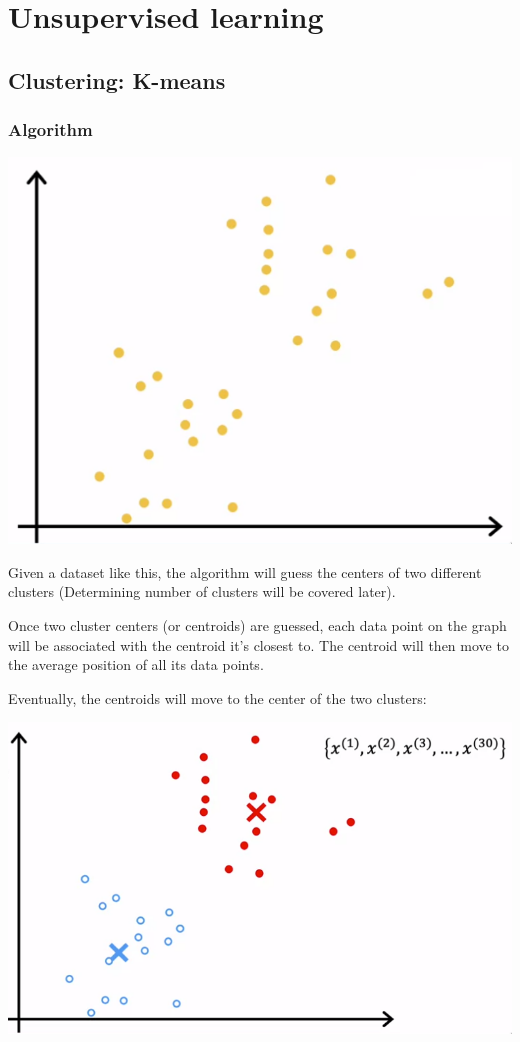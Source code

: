 \documentclass[12pt]{article}
\begin{document}
\section{Unsupervised learning}

\subsection{Clustering: K-means}

\subsubsection{Algorithm}

\includegraphics[scale=.5]{images/clusters.png}

Given a dataset like this, the algorithm will guess the centers of
two different clusters (Determining number of clusters will be covered later).

Once two cluster centers (or centroids) are guessed, each data point on the graph
will be associated with the centroid it's closest to. The centroid will then move to
the average position of all its data points.

Eventually, the centroids will move to the center of the two clusters:

\includegraphics[scale=.5]{images/cluster-finished.png}
\end{document}
